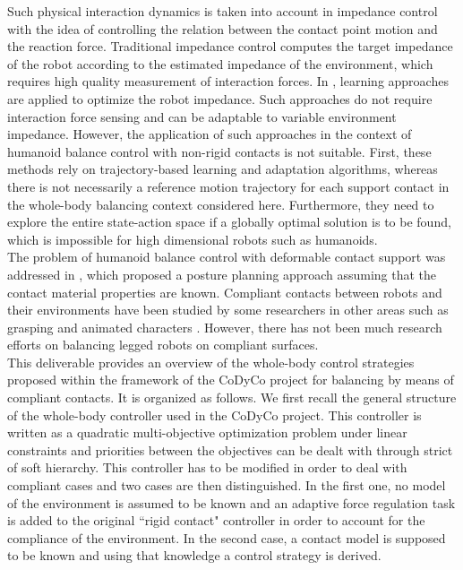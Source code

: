 \documentclass[12pt,a4paper,twoside]{article}
\begin{document}
Such physical interaction dynamics is taken into account in impedance control \cite{Hogan85} with the idea of controlling the relation between the contact point motion and the reaction force. Traditional impedance control \cite{Hogan85,Love95,Tsumugiwa02} computes the target impedance of the robot according to the estimated impedance of the environment, which requires high quality measurement of interaction forces. In \cite{Buchli10, Yang11}, learning approaches are applied to optimize the robot impedance. Such approaches do not require interaction force sensing and can be adaptable to variable environment impedance. However, the application of such approaches in the context of humanoid balance control with non-rigid contacts is not suitable. First, these methods rely on trajectory-based learning and adaptation algorithms, whereas there is not necessarily a reference motion trajectory for each support contact in the whole-body balancing context considered here. Furthermore, they need to explore the entire state-action space if a globally optimal solution is to be found, which is impossible for high dimensional robots such as humanoids.\\

The problem of humanoid balance control with deformable contact support was addressed in \cite{Bouyarmane11b}, which proposed a posture planning approach assuming that the contact material properties are known. Compliant contacts between robots and their environments have been studied by some researchers in other areas such as grasping \cite{Xydes&Kao99} and animated characters \cite{Jain&Liu11}. However, there has not been much research efforts on balancing legged robots on compliant surfaces.\\

This deliverable provides an overview of the whole-body control strategies proposed within the framework of the CoDyCo project for balancing by means of compliant contacts. It is organized as follows. We first recall the general structure of the whole-body controller used in the CoDyCo project. This controller is written as a quadratic multi-objective optimization problem under linear constraints and priorities between the objectives can be dealt with through strict of soft hierarchy. This controller has to be modified in order to deal with compliant cases and two cases are then distinguished. In the first one, no model of the environment is assumed to be known and an adaptive force regulation task is added to the original ``rigid contact" controller in order to account for the compliance of the environment. In the second case, a contact model is supposed to be known and using that knowledge a control strategy is derived.
\end{document}
